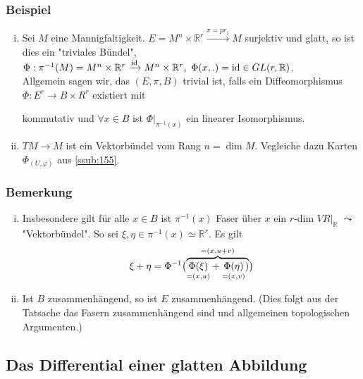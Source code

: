 \subsubsection{Beispiel}
\label{ssub:137}
\begin{enumerate}[(i)]
\item Sei $M$ eine Mannigfaltigkeit. $E = M^n\times \mathds{R}^r \xrightarrow{\pi = pr_1} M$ surjektiv und glatt, so ist dies ein "triviales Bündel", $\Phi: \pi^{-1}(M) = M^n\times \mathds{R}^r \xrightarrow{\id} M^n\times \mathds{R}^r,\ \Phi(x,.) = \id \in GL(r,\mathds{R})$.\\
Allgemein sagen wir, das $(E,\pi,B)$ trivial ist, falls ein Diffeomorphismus $\Phi: E^r \to B\times R^r$ existiert mit
\begin{figure}[H]
\end{figure}
kommutativ und $\forall x\in B$ ist $\Phi\vert_{\pi^{-1}(x)}$ ein linearer Isomorphismus.
\item $TM \to M$ ist ein Vektorbündel vom Rang $n = \dim M$. Vegleiche dazu Karten $\Phi_{(U,\varphi)}$ aus \ref{ssub:155}.
\end{enumerate}

\subsubsection{Bemerkung}
\label{ssub:138}
\begin{enumerate}[(i)]
\item Insbesondere gilt für alle $x\in B$ ist $\pi^{-1}(x)$ Faser über $x$ ein $r$-dim $VR\vert_{\mathds{R}}$ $\leadsto$ "Vektorbündel". So sei $\xi,\eta \in \pi^{-1}(x) \simeq \mathds{R}^r$. Es gilt
\[
\xi+\eta = \Phi^{-1}\enbrace[\big]{\overbrace{\underset{=(x,u)}{\Phi(\xi)} + \underset{=(x,v)}{\Phi(\eta)})}^{= (x,u+v)}}
\]
\item Ist $B$ zusammenhängend, so ist $E$ zusammenhängend. (Dies folgt aus der Tatsache das Fasern zusammenhängend sind und allgemeinen topologischen Argumenten.)
\end{enumerate}

\subsection{Das Differential einer glatten Abbildung}
\label{sub:16}


